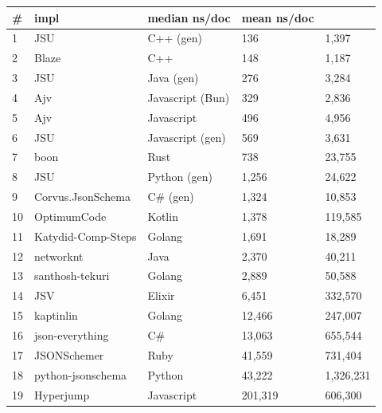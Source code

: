 \begin{tabular}{ll|l|ll}
\# & impl & median ns/doc & mean ns/doc \\
\hline
1 & JSU & C++ (gen) & 136 & 1,397 \\
2 & Blaze & C++ & 148 & 1,187 \\
3 & JSU & Java (gen) & 276 & 3,284 \\
4 & Ajv & Javascript (Bun) & 329 & 2,836 \\
5 & Ajv & Javascript & 496 & 4,956 \\
6 & JSU & Javascript (gen) & 569 & 3,631 \\
7 & boon & Rust & 738 & 23,755 \\
8 & JSU & Python (gen) & 1,256 & 24,622 \\
9 & Corvus.JsonSchema & C\# (gen) & 1,324 & 10,853 \\
10 & OptimumCode & Kotlin & 1,378 & 119,585 \\
11 & Katydid-Comp-Steps & Golang & 1,691 & 18,289 \\
12 & networknt & Java & 2,370 & 40,211 \\
13 & santhosh-tekuri & Golang & 2,889 & 50,588 \\
14 & JSV & Elixir & 6,451 & 332,570 \\
15 & kaptinlin & Golang & 12,466 & 247,007 \\
16 & json-everything & C\# & 13,063 & 655,544 \\
17 & JSONSchemer & Ruby & 41,559 & 731,404 \\
18 & python-jsonschema & Python & 43,222 & 1,326,231 \\
19 & Hyperjump & Javascript & 201,319 & 606,300 \\
\end{tabular}
